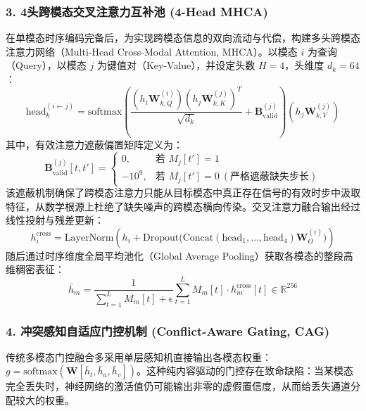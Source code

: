 \subsubsection{3. 4头跨模态交叉注意力互补池 (4-Head MHCA)}
在单模态时序编码完备后，为实现跨模态信息的双向流动与代偿，构建多头跨模态注意力网络（Multi-Head Cross-Modal Attention, MHCA）。以模态 $i$ 为查询（Query），以模态 $j$ 为键值对（Key-Value），并设定头数 $H = 4$，头维度 $d_k = 64$：
\begin{equation}
\text{head}_k^{(i \leftarrow j)} = \text{softmax}\left(\frac{(h_i \mathbf{W}_{k,Q}^{(i)}) (h_j \mathbf{W}_{k,K}^{(j)})^T}{\sqrt{d_k}} + \mathbf{B}_{\text{valid}}^{(j)}\right) (h_j \mathbf{W}_{k,V}^{(j)})
\end{equation}
其中，有效注意力遮蔽偏置矩阵定义为：
\begin{equation}
\mathbf{B}_{\text{valid}}^{(j)}[t, t'] = \begin{cases}
0, & \text{若 } M_j[t'] = 1 \\
-10^9, & \text{若 } M_j[t'] = 0 \ (\text{严格遮蔽缺失步长})
\end{cases}
\end{equation}
该遮蔽机制确保了跨模态注意力只能从目标模态中真正存在信号的有效时步中汲取特征，从数学根源上杜绝了缺失噪声的跨模态横向传染。交叉注意力融合输出经过线性投射与残差更新：
\begin{equation}
h_i^{\text{cross}} = \text{LayerNorm}\left( h_i + \text{Dropout}\big(\text{Concat}(\text{head}_1, \dots, \text{head}_4) \mathbf{W}_O^{(i)}\big) \right)
\end{equation}
随后通过时序维度全局平均池化（Global Average Pooling）获取各模态的整段高维稠密表征：
\begin{equation}
\bar{h}_m = \frac{1}{\sum_{t=1}^L M_m[t] + \epsilon} \sum_{t=1}^L M_m[t] \cdot h_m^{\text{cross}}[t] \in \mathbb{R}^{256}
\end{equation}

\subsubsection{4. 冲突感知自适应门控机制 (Conflict-Aware Gating, CAG)}
传统多模态门控融合多采用单层感知机直接输出各模态权重：$g = \text{softmax}(\mathbf{W} [\bar{h}_t, \bar{h}_a, \bar{h}_v])$。这种纯内容驱动的门控存在致命缺陷：当某模态完全丢失时，神经网络的激活值仍可能输出非零的虚假置信度，从而给丢失通道分配较大的权重。

